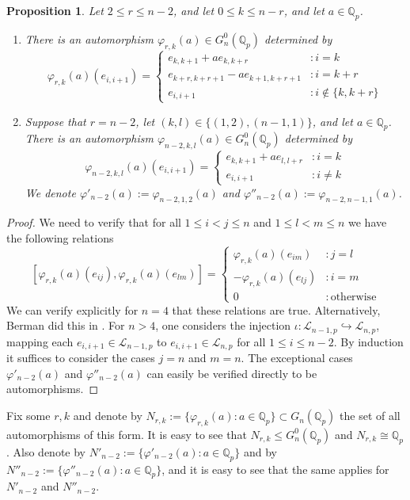 \documentclass[12pt]{article}
\newtheorem{proposition}[theorem]{Proposition}
\begin{document}
\begin{proposition}
\label{phi.r.k}
Let $2\leq{r}\leq{n-2}$, and let $0\leq{k}\leq{n-r}$, and let $a\in\mathbb{Q}_{p}$.
\begin{enumerate}
\item There is an automorphism $\varphi_{r,k}(a)\in{G_{n}^{0}(\mathbb{Q}_{p})}$ determined by \[
    \varphi_{r,k}(a)(e_{i,i+1})=\begin{cases}
        e_{k,k+1}+a{e_{k,k+r}} & : i=k\\
        e_{k+r,k+r+1}-a{e_{k+1,k+r+1}} & : i=k+r\\
        e_{i,i+1} & : i\notin\{k,k+r\}
    \end{cases}
\]
\item Suppose that $r=n-2$, let $(k,l)\in\{(1,2),(n-1,1)\}$, and let $a\in\mathbb{Q}_{p}$. There is an automorphism $\varphi_{n-2,k,l}(a)\in{G_{n}^{0}(\mathbb{Q}_{p})}$ determined by \[
    \varphi_{n-2,k,l}(a)(e_{i,i+1})=\begin{cases}
        e_{k,k+1}+a{e_{l,l+r}} & : i=k\\
        e_{i,i+1} & : i\neq{k}
    \end{cases}
\]
    We denote $\varphi'_{n-2}(a):=\varphi_{n-2,1,2}(a)$ and $\varphi''_{n-2}(a):=\varphi_{n-2,n-1,1}(a)$.
\end{enumerate}
\end{proposition}
\begin{proof}
We need to verify that for all $1\leq{i<j}\leq{n}$ and $1\leq{l<m}\leq{n}$ we have the following relations \[
    [\varphi_{r,k}(a)(e_{ij}),\varphi_{r,k}(a)(e_{lm})]=\begin{cases}
    \varphi_{r,k}(a)(e_{im}) & : j=l\\
        -\varphi_{r,k}(a)(e_{lj}) & : i=m\\
        0 & : \mathrm{otherwise}
    \end{cases}
\]
We can verify explicitly for $n=4$ that these relations are true. Alternatively, Berman did this in \cite{Berman}. For $n>4$, one considers the injection $\iota:\mathcal{L}_{n-1,p}\hookrightarrow\mathcal{L}_{n,p}$, mapping each $e_{i,i+1}\in\mathcal{L}_{n-1,p}$ to $e_{i,i+1}\in\mathcal{L}_{n,p}$ for all $1\leq{i}\leq{n-2}$. By induction it suffices to consider the cases $j=n$ and $m=n$. The exceptional cases $\varphi'_{n-2}(a)$ and $\varphi''_{n-2}(a)$ can easily be verified directly to be automorphisms.
\end{proof}
Fix some $r,k$ and denote by $N_{r,k}:=\{\varphi_{r,k}(a) : a\in\mathbb{Q}_{p}\}\subset{G_{n}(\mathbb{Q}_{p})}$ the set of all automorphisms of this form. It is easy to see that $N_{r,k}\leq{G_{n}^{0}(\mathbb{Q}_{p})}$ and $N_{r,k}\cong\mathbb{Q}_{p}$.
Also denote by $N'_{n-2}:=\{\varphi'_{n-2}(a) : a\in\mathbb{Q}_{p}\}$ and by $N''_{n-2}:=\{\varphi''_{n-2}(a) : a\in\mathbb{Q}_{p}\}$, and it is easy to see that the same applies for $N'_{n-2}$ and $N''_{n-2}$.
\end{document}
